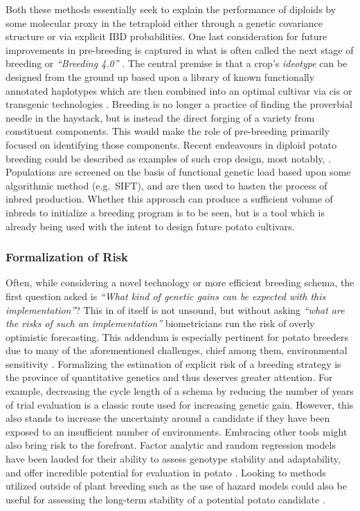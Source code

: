 \documentclass[
]{article}
\begin{document}
Both these methods essentially seek to explain the performance of
diploids by some molecular proxy in the tetraploid either through a
genetic covariance structure or via explicit IBD probabilities. One last
consideration for future improvements in pre-breeding is captured in
what is often called the next stage of breeding or \emph{``Breeding
4.0''} \autocite{Wallace2018}. The central premise is that a crop's
\emph{ideotype} can be designed from the ground up based upon a library
of known functionally annotated haplotypes which are then combined into
an optimal cultivar via cis or transgenic technologies
\autocite{Varshney2021}. Breeding is no longer a practice of finding the
proverbial needle in the haystack, but is instead the direct forging of
a variety from constituent components. This would make the role of
pre-breeding primarily focused on identifying those components. Recent
endeavours in diploid potato breeding could be described as examples of
such crop design, most notably, \textcite{Zhang2021}. Populations are
screened on the basis of functional genetic load based upon some
algorithmic method (e.g.~SIFT), and are then used to hasten the process
of inbred production. Whether this approach can produce a sufficient
volume of inbreds to initialize a breeding program is to be seen, but is
a tool which is already being used with the intent to design future
potato cultivars.

\subsubsection{Formalization of Risk}\label{formalization-of-risk}

Often, while considering a novel technology or more efficient breeding
schema, the first question asked is \emph{``What kind of genetic gains
can be expected with this implementation''}? This in of itself is not
unsound, but without asking \emph{``what are the risks of such an
implementation''} biometricians run the risk of overly optimistic
forecasting. This addendum is especially pertinent for potato breeders
due to many of the aforementioned challenges, chief among them,
environmental sensitivity \autocite{George2017}. Formalizing the
estimation of explicit risk of a breeding strategy is the province of
quantitative genetics and thus deserves greater attention. For example,
decreasing the cycle length of a schema by reducing the number of years
of trial evaluation is a classic route used for increasing genetic gain.
However, this also stands to increase the uncertainty around a candidate
if they have been exposed to an insufficient number of environments.
Embracing other tools might also bring risk to the forefront. Factor
analytic and random regression models have been lauded for their ability
to assess genotype stability and adaptability, and offer incredible
potential for evaluation in potato \autocite{Souza2020,Smith2018}.
Looking to methods utilized outside of plant breeding such as the use of
hazard models could also be useful for assessing the long-term stability
of a potential potato candidate \autocite{Yazdi2002a}.
\end{document}
